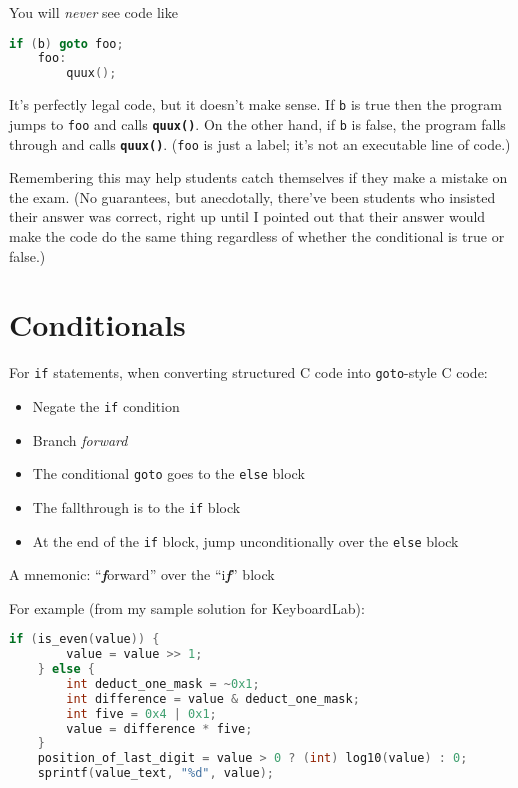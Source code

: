 \documentclass{article}
\newcommand{\function}[1]{\textbf{\lstinline{#1}}}
\begin{document}
You will \textit{never} see code like

\begin{lstlisting}[language=C]
        if (b) goto foo;
    foo:
        quux();
\end{lstlisting}

It's perfectly legal code, but it doesn't make sense.
If \lstinline{b} is true then the program jumps to \lstinline{foo} and calls \function{quux()}.
On the other hand, if \lstinline{b} is false, the program falls through and calls \function{quux()}.
(\lstinline{foo} is just a label; it's not an executable line of code.)

Remembering this may help students catch themselves if they make a mistake on the exam.
(No guarantees, but anecdotally, there've been students who insisted their answer was correct, right up until I pointed out that their answer would make the code do the same thing regardless of whether the conditional is true or false.)

\section{Conditionals}

For \lstinline{if} statements, when converting structured C code into \lstinline{goto}-style C code:
\begin{itemize}
    \item Negate the \lstinline{if} condition
    \item Branch \textit{forward}
    \item The conditional \lstinline{goto} goes to the \lstinline{else} block
    \item The fallthrough is to the \lstinline{if} block
    \item At the end of the \lstinline{if} block, jump unconditionally over the \lstinline{else} block
\end{itemize}
A mnemonic: ``\textbf{\textit{f}}orward'' over the ``i\textbf{\textit{f}}'' block

For example (from my sample solution for KeyboardLab):

\begin{lstlisting}[language=C, linebackgroundcolor={
%    \ifodd\value{lstnumber}\color{green}\fi
    \ifnum\value{lstnumber}=1 \color{green}\fi,
    \ifnum\value{lstnumber}=3 \color{green}\fi,
    \ifnum\value{lstnumber}=8 \color{green}\fi,
}]
    if (is_even(value)) {
        value = value >> 1;
    } else {
        int deduct_one_mask = ~0x1;
        int difference = value & deduct_one_mask;
        int five = 0x4 | 0x1;
        value = difference * five;
    }
    position_of_last_digit = value > 0 ? (int) log10(value) : 0;
    sprintf(value_text, "%d", value);
\end{lstlisting}
\end{document}
